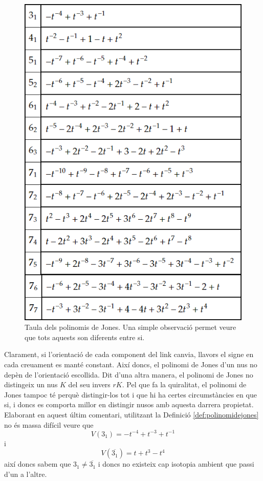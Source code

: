 \begin{figure}
	\centering
	\includegraphics[width=\linewidth]{img/jonestaula.png}
	\caption{Taula dels polinomis de Jones. Una simple observació permet veure que tots aquests son diferents entre si.}\label{fig:polinomidejones}
\end{figure}

Clarament, si l'orientació de cada component del link canvia, llavors el signe en cada creuament es manté constant. Així doncs, el polinomi de Jones d'un nus no depèn de l'orientació escollida. Dit d'una altra manera, el polinomi de Jones no distingeix un nus $K$ del seu invers $rK$. Pel que fa la quiralitat, el polinomi de Jones tampoc té perquè distingir-los tot i que hi ha certes circumstàncies en que si, i doncs es comporta millor en distingir nusos amb aquesta darrera propietat. Elaborant en aquest últim comentari, utilitzant la Definició \ref{def:polinomidejones} no és massa difícil veure que $$V(3_1)=-t^{-4}+t^{-3}+t^{-1}$$ i $$V(\overline{3_1})=t+t^3-t^4$$ així doncs sabem que $3_1\neq\overline{3_1}$ i doncs no existeix cap isotopia ambient que passi d'un a l'altre.\\

